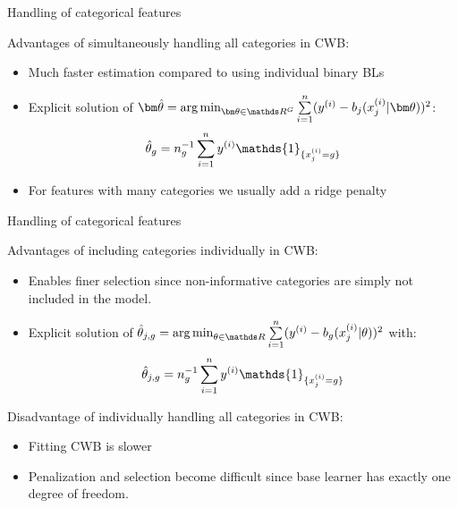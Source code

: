 \documentclass[11pt,compress,t,notes=noshow, xcolor=table]{beamer}
\begin{document}
\begin{framev}{Handling of categorical features}

Advantages of simultaneously handling all categories in CWB: 
\begin{itemize}
    \item 
        Much faster estimation compared to using individual binary BLs

    \item 
        Explicit solution of $\thetavh = \argmin_{\thetav\in\R^G}\sumin (\yi - b_j(x^{(i)}_j | \thetav))^2$:
        $$
        \thetah_g = n_g^{-1}\sumin \yi \mathds{1}_{\{x^{(i)}_j = g\}}
        $$

    \item 
        For features with many categories we usually add a ridge penalty
\end{itemize}


\end{framev}
\begin{framev}{Handling of categorical features}

Advantages of including categories individually in CWB: 
\begin{itemize}
    \item 
        Enables finer selection since non-informative categories are simply not included in the model. %

    \item 
        Explicit solution of $\thetah_{j,g} = \argmin_{\theta\in\R}\sumin (\yi - b_g(x^{(i)}_j|\theta))^2$ with:
        $$\thetah_{j,g} = n_g^{-1}\sumin \yi \mathds{1}_{\{x^{(i)}_j = g\}}$$
\end{itemize}

Disadvantage of individually handling all categories in CWB:
\begin{itemize}
    \item 
        Fitting CWB is slower 

    \item 
        Penalization and selection become difficult since base learner has exactly one degree of freedom.
\end{itemize}

\end{framev}
\end{document}
